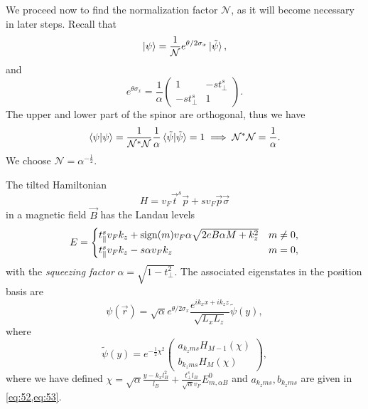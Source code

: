 We proceed now to find the normalization factor \( \mathcal{N} \), as it will become necessary in later steps.
Recall that
\[
  \ket{\psi} = \frac{1}{\mathcal{N}} e^{\theta /2 \sigma _x} \ket{\tilde{\psi}},
\]
and
\[
e^{\theta \sigma _x} =
\frac{1}{\alpha }
\begin{pmatrix}
  1 & -s t_{\perp}^s\\
  -s t_{\perp}^s & 1
\end{pmatrix}.
\]
The upper and lower part of the spinor are orthogonal, thus we have
\begin{equation}
  \label{eq:54}
  \braket{\psi  | \psi } = \frac{1}{\mathcal{N}^{*} \mathcal{N}} \frac{1}{\alpha } \braket{\tilde{\psi}  | \tilde{\psi} } = 1 \implies \mathcal{N}^{*}\mathcal{N} = \frac{1}{\alpha }.
\end{equation}
We choose \( \mathcal{N} = \alpha^{-\frac{1}{2}} \).

\begin{summary}\label{summary:llevels}
The tilted Hamiltonian
  \[
    H = v_F \vec{t}^s \vec{p} + s v_F \vec{p} \vec{\sigma}
  \]
  in a magnetic field \( \vec{B} \) has the Landau levels
  \[
    E =
    \begin{cases}
      t^s_{\parallel} v_F k_z + \operatorname{sign}(m) v_F \alpha \sqrt{2 e B \alpha M + k_{z} ^2} & m \neq 0,\\
      t^s_{\parallel} v_F k_z - s \alpha v_F k_z & m = 0,
    \end{cases}
  \]
  with the \emph{squeezing factor} \( \alpha = \sqrt{1 - t_{\perp} ^2}  \).
  The associated eigenstates in the position basis are
  \[
    \psi(\vec{r}) = \sqrt{\alpha} e^{\theta /2 \sigma_x}
    \frac{
      e^{ik_{x} x + ik_{z} z}
    }{
      \sqrt{L_{x}  L_z}
    } \tilde{\psi}(y),
    \]
    where
    \[
      \tilde{\psi} (y) = e^{-\frac{1}{2} \chi^2}
      \begin{pmatrix}
        a_{k_z m s} H_{M - 1} (\chi) \\
        b_{k_z m s} H_M (\chi)
      \end{pmatrix},
    \]
    where we have defined \( \chi = \sqrt{\alpha} \frac{ y - k_x l_B^2 }{l_{B}} + \frac{t_{\perp}^s l_B}{\sqrt{\alpha} v_{F}} E^0_{m, \alpha B} \) and \( a_{k_z m s}, b_{k_z m s} \) are given in \cref{eq:52,eq:53}.
\end{summary}
